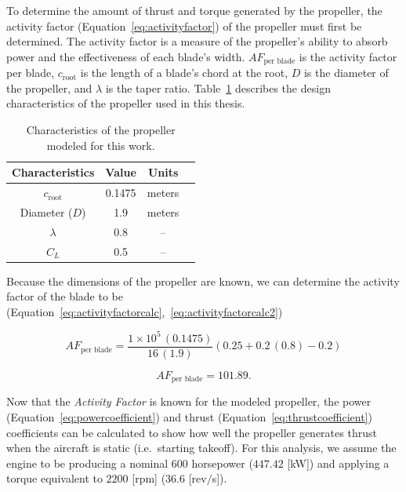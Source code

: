 To determine the amount of thrust and torque generated by the propeller, the activity factor (Equation~\ref{eq:activityfactor}) of the propeller must first be determined. The activity factor is a measure of the propeller's ability to absorb power and the effectiveness of each blade's width. \(AF_{\textrm{per blade}}\) is the activity factor per blade, \(c_{\textrm{root}}\) is the length of a blade's chord at the root, \(D\) is the diameter of the propeller, and \( \lambda \) is the taper ratio. Table~\ref{tbl:propparams} describes the design characteristics of the propeller used in this thesis.

\begin{table}[!ht]
    \caption{Characteristics of the propeller modeled for this work.}\label{tbl:propparams}
    \centering
    \begin{tabular}{cccc}
        \toprule
        \textbf{Characteristics } & \textbf{Value} & \textbf{Units} \\
        \midrule
        \(c_{\textrm{root}}\)     & 0.1475         & meters         \\
        Diameter (\(D\))          & 1.9            & meters         \\
        \( \lambda \)             & 0.8            & {--}           \\
        \(C_L\)                   & 0.5            & {--}           \\
        \bottomrule
    \end{tabular}
\end{table}

Because the dimensions of the propeller are known, we can determine the activity factor of the blade to be (Equation~\ref{eq:activityfactorcalc},~\ref{eq:activityfactorcalc2})

\begin{equation}\label{eq:activityfactorcalc}
    AF_{\textrm{per blade}} = \frac{1 \times 10^5 \, (0.1475)}{16 \, (1.9)} \left(0.25 + 0.2 \, (0.8) - 0.2 \right)
\end{equation}

\begin{equation}\label{eq:activityfactorcalc2}
    AF_{\textrm{per blade}} = 101.89.
\end{equation}

Now that the \textit{Activity Factor} is known for the modeled propeller, the power (Equation~\ref{eq:powercoefficient}) and thrust (Equation~\ref{eq:thrustcoefficient}) coefficients can be calculated to show how well the propeller generates thrust when the aircraft is static (i.e.\ starting takeoff). For this analysis, we assume the engine to be producing a nominal \(600\) horsepower (\(447.42\) [kW]) and applying a torque equivalent to \(2200\) [rpm] (\(36.6\) [rev\(/\)s]).

